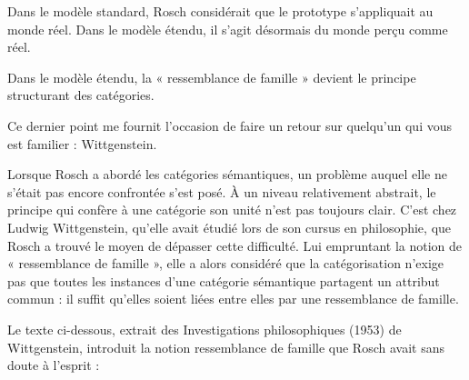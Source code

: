 \noindent{\color{BellaTeal}$\diamond$}\hspace{.6em}Dans le modèle standard, Rosch considérait que le prototype s’appliquait au monde réel. Dans le modèle étendu, il s’agit désormais du monde perçu comme réel.\par

\noindent{\color{BellaTeal}$\diamond$}\hspace{.6em}Dans le modèle étendu, la « ressemblance de famille » devient le principe structurant des catégories.\par

Ce dernier point me fournit l’occasion de faire un retour sur quelqu’un qui vous est familier : Wittgenstein.\par


Lorsque Rosch a abordé les catégories sémantiques, un problème auquel elle ne s’était pas encore confrontée s’est posé. À un niveau relativement abstrait, le principe qui confère à une catégorie son unité n’est pas toujours clair. C’est chez Ludwig Wittgenstein, qu’elle avait étudié lors de son cursus en philosophie, que Rosch a trouvé le moyen de dépasser cette difficulté. Lui empruntant la notion de « ressemblance de famille », elle a alors considéré que la catégorisation n’exige pas que toutes les instances d’une catégorie sémantique partagent un attribut commun : il suffit qu’elles soient liées entre elles par une ressemblance de famille.\par

Le texte ci-dessous, extrait des Investigations philosophiques (1953) de Wittgenstein, introduit la notion ressemblance de famille que Rosch avait sans doute à l’esprit :\par



